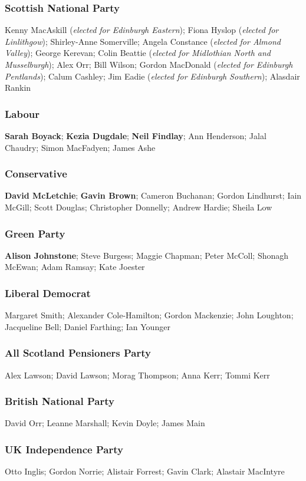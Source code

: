 \begin{resultsiii}
\subsubsection*{Scottish National Party}
Kenny MacAskill (\emph{elected for Edinburgh Eastern}); Fiona Hyslop (\emph{elected for Linlithgow}); Shirley-Anne Somerville; Angela Constance (\emph{elected for Almond Valley}); George Kerevan; Colin Beattie (\emph{elected for Midlothian North and Musselburgh}); Alex Orr; Bill Wilson; Gordon MacDonald (\emph{elected for Edinburgh Pentlands}); Calum Cashley; Jim Eadie (\emph{elected for Edinburgh Southern}); Alasdair Rankin
\subsubsection*{Labour}
\textbf{Sarah Boyack}; \textbf{Kezia Dugdale}; \textbf{Neil Findlay}; Ann Henderson; Jalal Chau\-dry; Simon MacFadyen; James Ashe
\subsubsection*{Conservative}
\textbf{David McLetchie}; \textbf{Gavin Brown}; Cameron Buchanan; Gordon Lindhurst; Iain McGill; Scott Douglas; Christopher Donnelly; Andrew Hardie; Sheila Low
\subsubsection*{Green Party}
\textbf{Alison Johnstone}; Steve Burgess; Maggie Chapman; Peter McColl; Shonagh McEwan; Adam Ramsay; Kate Joester
\subsubsection*{Liberal Democrat}
Margaret Smith; Alexander Cole-Hamilton; Gordon Mackenzie; John Loughton; Jacqueline Bell; Daniel Farthing; Ian Younger
\subsubsection*{All Scotland Pensioners Party}
Alex Lawson; David Lawson; Morag Thompson; Anna Kerr; Tommi Kerr
\subsubsection*{British National Party}
David Orr; Leanne Marshall; Kevin Doyle; James Main
\subsubsection*{UK Independence Party}
Otto Inglis; Gordon Norrie; Alistair Forrest; Gavin Clark; Alastair MacIntyre

\end{resultsiii}
